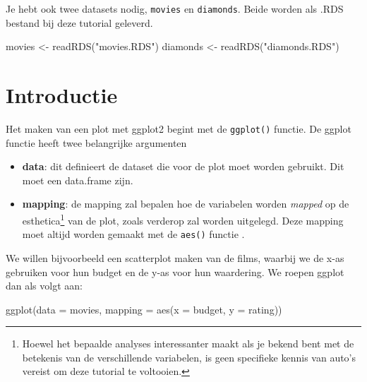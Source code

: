 \documentclass[]{tufte-book}
\newenvironment{Shaded}{}{}
\newcommand{\AttributeTok}[1]{\textcolor[rgb]{0.49,0.56,0.16}{#1}}
\newcommand{\FunctionTok}[1]{\textcolor[rgb]{0.02,0.16,0.49}{#1}}
\newcommand{\NormalTok}[1]{#1}
\newcommand{\OtherTok}[1]{\textcolor[rgb]{0.00,0.44,0.13}{#1}}
\newcommand{\StringTok}[1]{\textcolor[rgb]{0.25,0.44,0.63}{#1}}
\providecommand{\tightlist}{%
  \setlength{\itemsep}{0pt}\setlength{\parskip}{0pt}}
\begin{document}
Je hebt ook twee datasets nodig, \texttt{movies} en \texttt{diamonds}. Beide worden als .RDS bestand bij deze tutorial geleverd.

\begin{Shaded}
\begin{Highlighting}[]
\NormalTok{movies }\OtherTok{\textless{}{-}} \FunctionTok{readRDS}\NormalTok{(}\StringTok{"movies.RDS"}\NormalTok{)}
\NormalTok{diamonds }\OtherTok{\textless{}{-}} \FunctionTok{readRDS}\NormalTok{(}\StringTok{"diamonds.RDS"}\NormalTok{)}
\end{Highlighting}
\end{Shaded}

\hypertarget{introductie}{%
\section{Introductie}\label{introductie}}

Het maken van een plot met ggplot2 begint met de \texttt{ggplot()} functie. De ggplot functie heeft twee belangrijke argumenten

\begin{itemize}
\tightlist
\item
  \textbf{data}: dit definieert de dataset die voor de plot moet worden gebruikt. Dit moet een data.frame zijn.
\item
  \textbf{mapping}: de mapping zal bepalen hoe de variabelen worden \emph{mapped} op de esthetica\footnote{Hoewel het bepaalde analyses interessanter maakt als je bekend bent met de betekenis van de verschillende variabelen, is geen specifieke kennis van auto's vereist om deze tutorial te voltooien.} van de plot, zoals verderop zal worden uitgelegd. Deze mapping moet altijd worden gemaakt met de \texttt{aes()} functie .
\end{itemize}

We willen bijvoorbeeld een scatterplot maken van de films, waarbij we de x-as gebruiken voor hun budget en de y-as voor hun waardering. We roepen ggplot dan als volgt aan:

\begin{Shaded}
\begin{Highlighting}[]
\FunctionTok{ggplot}\NormalTok{(}\AttributeTok{data =}\NormalTok{ movies, }\AttributeTok{mapping =} \FunctionTok{aes}\NormalTok{(}\AttributeTok{x =}\NormalTok{ budget, }\AttributeTok{y =}\NormalTok{ rating))}
\end{Highlighting}
\end{Shaded}
\end{document}
